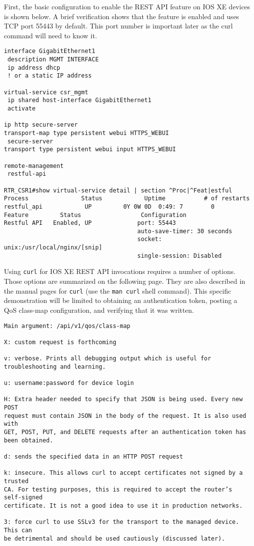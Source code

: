 First, the basic configuration to enable the REST API feature on IOS XE
devices is shown below. A brief verification shows that the feature is enabled
and uses TCP port 55443 by default. This port number is important later as the
curl command will need to know it.

\begin{verbatim}
interface GigabitEthernet1
 description MGMT INTERFACE
 ip address dhcp
 ! or a static IP address

virtual-service csr_mgmt
 ip shared host-interface GigabitEthernet1
 activate

ip http secure-server
transport-map type persistent webui HTTPS_WEBUI
 secure-server
transport type persistent webui input HTTPS_WEBUI

remote-management
 restful-api

RTR_CSR1#show virtual-service detail | section ^Proc|^Feat|estful  
Process               Status            Uptime           # of restarts
restful_api            UP         0Y 0W 0D  0:49: 7        0
Feature         Status                 Configuration
Restful API   Enabled, UP             port: 55443
                                      auto-save-timer: 30 seconds
                                      socket: unix:/usr/local/nginx/[snip]
                                      single-session: Disabled
\end{verbatim}

Using \verb|curl| for IOS XE REST API invocations requires a number of options. Those
options are summarized on the following page. They are also described in the
manual pages for \verb|curl| (use the \verb|man curl| shell command). This specific
demonstration will be limited to obtaining an authentication token, posting a
QoS class-map configuration, and verifying that it was written.

\begin{verbatim}
Main argument: /api/v1/qos/class-map

X: custom request is forthcoming

v: verbose. Prints all debugging output which is useful for troubleshooting and learning.

u: username:password for device login

H: Extra header needed to specify that JSON is being used. Every new POST
request must contain JSON in the body of the request. It is also used with
GET, POST, PUT, and DELETE requests after an authentication token has been obtained.

d: sends the specified data in an HTTP POST request

k: insecure. This allows curl to accept certificates not signed by a trusted
CA. For testing purposes, this is required to accept the router’s self-signed
certificate. It is not a good idea to use it in production networks.

3: force curl to use SSLv3 for the transport to the managed device. This can
be detrimental and should be used cautiously (discussed later).
\end{verbatim}

